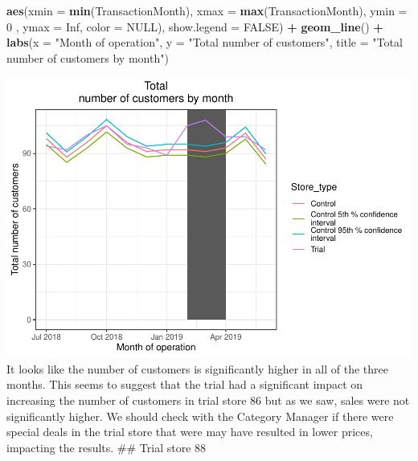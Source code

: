 \documentclass[
]{article}
\newenvironment{Shaded}{\begin{snugshade}}{\end{snugshade}}
\newcommand{\AttributeTok}[1]{\textcolor[rgb]{0.13,0.29,0.53}{#1}}
\newcommand{\ConstantTok}[1]{\textcolor[rgb]{0.56,0.35,0.01}{#1}}
\newcommand{\DecValTok}[1]{\textcolor[rgb]{0.00,0.00,0.81}{#1}}
\newcommand{\FunctionTok}[1]{\textcolor[rgb]{0.13,0.29,0.53}{\textbf{#1}}}
\newcommand{\NormalTok}[1]{#1}
\newcommand{\SpecialCharTok}[1]{\textcolor[rgb]{0.81,0.36,0.00}{\textbf{#1}}}
\newcommand{\StringTok}[1]{\textcolor[rgb]{0.31,0.60,0.02}{#1}}
\begin{document}
\begin{Shaded}
\begin{Highlighting}[]
\FunctionTok{aes}\NormalTok{(}\AttributeTok{xmin =} \FunctionTok{min}\NormalTok{(TransactionMonth), }\AttributeTok{xmax =} \FunctionTok{max}\NormalTok{(TransactionMonth), }\AttributeTok{ymin =} \DecValTok{0}\NormalTok{ , }\AttributeTok{ymax =}
\ConstantTok{Inf}\NormalTok{, }\AttributeTok{color =} \ConstantTok{NULL}\NormalTok{), }\AttributeTok{show.legend =} \ConstantTok{FALSE}\NormalTok{) }\SpecialCharTok{+}
  \FunctionTok{geom\_line}\NormalTok{() }\SpecialCharTok{+}
  \FunctionTok{labs}\NormalTok{(}\AttributeTok{x =} \StringTok{"Month of operation"}\NormalTok{, }\AttributeTok{y =} \StringTok{"Total number of customers"}\NormalTok{, }\AttributeTok{title =} \StringTok{"Total}
\StringTok{number of customers by month"}\NormalTok{)}
\end{Highlighting}
\end{Shaded}

\includegraphics{InsideSherpa_Task2_files/figure-latex/unnamed-chunk-20-1}
It looks like the number of customers is significantly higher in all of
the three months. This seems to suggest that the trial had a significant
impact on increasing the number of customers in trial store 86 but as we
saw, sales were not significantly higher. We should check with the
Category Manager if there were special deals in the trial store that
were may have resulted in lower prices, impacting the results. \#\#
Trial store 88
\end{document}
